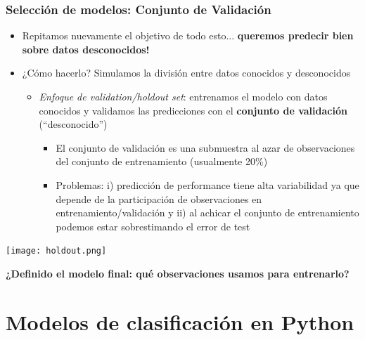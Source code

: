 \documentclass[leqno, 10pt, envcountsect]{beamer}
\numberwithin{equation}{section}
\theoremstyle{definition}
\theoremstyle{example}
\numberwithin{figure}{section}
\numberwithin{table}{section}
\let\olditem\item
\renewcommand{\item}{%
\olditem\vspace{1pt}}
\begin{document}
\begin{frame}[fragile=singleslide]
  \frametitle{Selección de modelos: Conjunto de Validación}
  \begin{itemize}
    \item Repitamos nuevamente el objetivo de todo esto... \textbf{queremos predecir bien
      sobre datos desconocidos!}
    \item ¿Cómo hacerlo? Simulamos la división entre datos conocidos y
      desconocidos
          \begin{itemize}
            \item \textit{Enfoque de validation/holdout set}: entrenamos el
              modelo con datos conocidos y validamos las predicciones con el
              \textbf{conjunto de validación} (\enquote{desconocido})
              \begin{itemize}
                \item El conjunto de validación es una submuestra al azar de
                  observaciones del conjunto de entrenamiento (usualmente
                  20\%)
                \item Problemas: i) predicción de performance tiene alta
                  variabilidad ya que depende de la participación de
                  observaciones en entrenamiento/validación y ii) al achicar el
                  conjunto de entrenamiento podemos estar sobrestimando el error
                  de test
              \end{itemize}
           \end{itemize}
  \end{itemize}
  \begin{center}
    \texttt{[image: holdout.png]}
  \end{center}
  \textbf{¿Definido el modelo final: qué observaciones usamos para entrenarlo?}
\end{frame}

\section{Modelos de clasificación en Python}
\label{sec:modelos_de_clasificacion_en_python}
\end{document}
